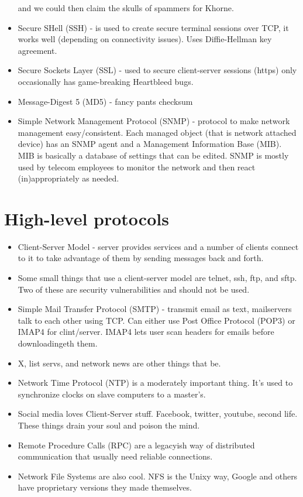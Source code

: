 \documentclass{scrartcl}
\begin{document}
\begin{itemize}
and we could then claim the skulls of spammers for Khorne.
\item Secure SHell (SSH) - is used to create secure terminal sessions over TCP,
it works well (depending on connectivity issues). Uses Diffie-Hellman key
agreement.
\item Secure Sockets Layer (SSL) - used to secure client-server sessions (https)
only occasionally has game-breaking Heartbleed bugs.
\item Message-Digest 5 (MD5) - fancy pants checksum
\item Simple Network Management Protocol (SNMP) - protocol to make
network management easy/consistent. Each managed object (that is network
attached device) has an SNMP agent and a Management Information Base (MIB).
MIB is basically a database of settings that can be edited. SNMP is mostly used
by telecom employees to monitor the network and then react (in)appropriately
as needed.
\end{itemize}
\section*{High-level protocols}
\begin{itemize}
\item Client-Server Model - server provides services and a number of clients
connect to it to take advantage of them by sending messages back and forth.
\item Some small things that use a client-server model are telnet, ssh, ftp, and
sftp. Two of these are security vulnerabilities and should not be used.
\item Simple Mail Transfer Protocol (SMTP) - transmit email as text,
mailservers talk to each other using TCP. Can either use Post Office Protocol
(POP3) or IMAP4 for clint/server. IMAP4 lets user scan headers for emails
before downloadingeth them.
\item X, list servs, and network news are other things that be.
\item Network Time Protocol (NTP) is a moderately important thing. It's used
to synchronize clocks on slave computers to a master's.
\item Social media loves Client-Server stuff. Facebook, twitter, youtube,
second life. These things drain your soul and poison the mind.
\item Remote Procedure Calls (RPC) are a legacyish way of distributed
communication that usually need reliable connections.
\item Network File Systems are also cool. NFS is the Unixy way, Google and
others have proprietary versions they made themselves.
\end{itemize}
\end{document}
